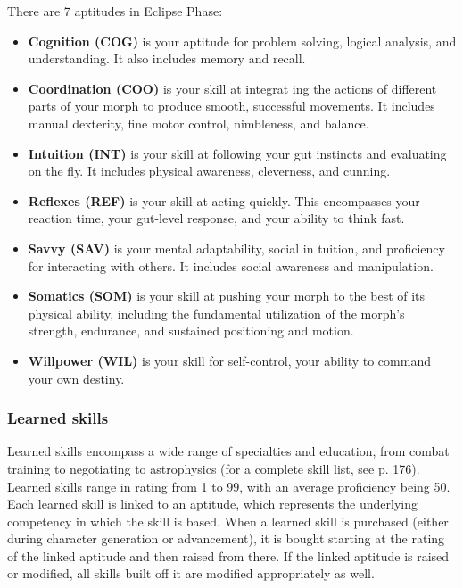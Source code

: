 There are 7 aptitudes in Eclipse Phase: 

\begin{itemize} \item \textbf{Cognition (COG)} is your aptitude for problem solving, logical analysis, and understanding. It also includes memory and recall. \item \textbf{Coordination (COO)} is your skill at integrat ing the actions of different parts of your morph to produce smooth, successful movements. It includes manual dexterity, fine motor control, nimbleness, and balance. \item \textbf{Intuition (INT)} is your skill at following your gut instincts and evaluating on the fly. It includes physical awareness, cleverness, and cunning. \item \textbf{Reflexes (REF)} is your skill at acting quickly. This encompasses your reaction time, your gut-level response, and your ability to think fast. \item \textbf{Savvy (SAV)} is your mental adaptability, social in tuition, and proficiency for interacting with others. It includes social awareness and manipulation. \item \textbf{Somatics (SOM)} is your skill at pushing your morph to the best of its physical ability, including the fundamental utilization of the morph's strength, endurance, and sustained positioning and motion. \item \textbf{Willpower (WIL)} is your skill for self-control, your ability to command your own destiny. \end{itemize} 

\subsubsection{Learned skills} \label{sec:learned-skills} 

Learned skills encompass a wide range of specialties and education, from combat training to negotiating to astrophysics (for a complete skill list, see p. 176). Learned skills range in rating from 1 to 99, with an average proficiency being 50. Each learned skill is linked to an aptitude, which represents the underlying competency in which the skill is based. When a learned skill is purchased (either during character generation or advancement), it is bought starting at the rating of the linked aptitude and then raised from there. If the linked aptitude is raised or modified, all skills built off it are modified appropriately as well. 


